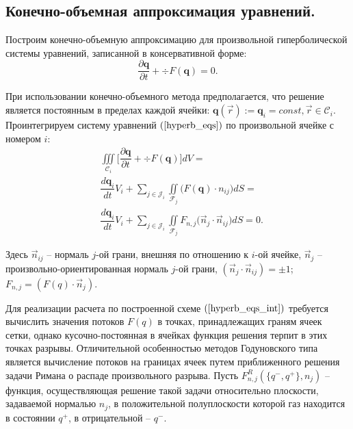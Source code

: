 \documentclass[14pt, a4paper, fleqn]{extreport}
\begin{document}
	\subsection{Конечно-объемная аппроксимация уравнений.}
	
	Построим конечно-объемную аппроксимацию для
	произвольной гиперболической системы уравнений, записанной в консервативной форме:
	\begin{equation}
		\label{hyperb_eqs}
		\dfrac{\partial \textbf{q}}{\partial t} + \div{F(\textbf{q})} = 0.
	\end{equation}
	
	При использовании конечно-объемного метода предполагается, что решение является 
	постоянным в пределах каждой ячейки: $\textbf{q}(\vec{r}) := \textbf{q}_i = const, \vec{r} \in \mathcal{C}_i$.
	Проинтегрируем систему уравнений $(\ref{hyperb_eqs})$ по произвольной ячейке с номером $i$:
	\begin{equation}
	\label{hyperb_eqs_int}
	\begin{split}
		&\iiint\limits_{\mathcal{C}_i} \Big[
			\dfrac{\partial \textbf{q}}{\partial t} + \div{F(\textbf{q})} \Big]dV = 
		\\
		&\dfrac{d \textbf{q}_i}{d t}V_i
			+ \sum\limits_{j \in \mathcal{J}_i}\iint\limits_{\mathcal{F}_j} \Big( F(\textbf{q}) \cdot n_{ij} \Big) dS =
		\\
		&\dfrac{d \textbf{q}_i}{d t}V_i
			+ \sum\limits_{j \in \mathcal{J}_i}\iint\limits_{\mathcal{F}_j} 
				F_{n,j} \Big( \vec{n}_{j} \cdot \vec{n}_{ij} \Big) dS = 0.
	\end{split}
	\end{equation}
	
	Здесь $\vec{n}_{ij}$ -- нормаль $j$-ой грани, внешняя по отношению к $i$-ой ячейке, 
	$\vec{n}_j$ -- произвольно-ориентированная нормаль $j$-ой грани, $(\vec{n}_{j} \cdot \vec{n}_{ij}) = \pm 1$;
	$F_{n,j} = (F(q) \cdot \vec{n}_{j})$.
	
	Для реализации расчета по построенной схеме $(\ref{hyperb_eqs_int})$ требуется вычислить значения потоков $F(q)$ в точках, 
	принадлежащих граням ячеек сетки, однако кусочно-постоянная в ячейках функция решения терпит в этих точках разрывы.
	Отличительной особенностью методов Годуновского типа является вычисление потоков на границах 
	ячеек путем приближенного решения задачи Римана о распаде произвольного разрыва.
	Пусть $F_{n,j}^R(\lbrace q^{-}, q^{+} \rbrace, n_j)$ -- функция, осуществляющая решение такой задачи относительно плоскости, 
	задаваемой нормалью $n_j$,
	в положительной полуплоскости которой газ находится в состоянии $q^{+}$, в отрицательной -- $q^{-}$.
	
\end{document}
